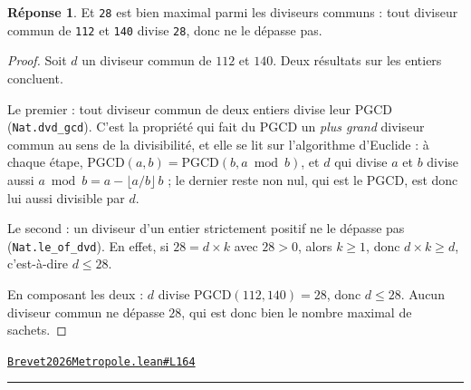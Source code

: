 \documentclass[11pt,a4paper]{article}
\theoremstyle{definition}
\theoremstyle{plain}
\theoremstyle{definition}
\newtheorem*{reponse}{Réponse}
\newcommand{\source}[2]{\par\smallskip\noindent\hfill{\footnotesize\href{#1}{\texttt{#2}}}\par\smallskip}
\begin{document}
\begin{reponse}
Et \texttt{28} est bien maximal parmi les diviseurs communs : tout diviseur commun de
\texttt{112} et \texttt{140} divise \texttt{28}, donc ne le dépasse pas.
\end{reponse}
\begin{proof}
Soit $d$ un diviseur commun de $112$ et $140$. Deux résultats sur les entiers concluent.

Le premier : tout diviseur commun de deux entiers divise leur PGCD
(\texttt{Nat.dvd\_gcd}). C'est la propriété qui fait du PGCD un \emph{plus grand} diviseur
commun au sens de la divisibilité, et elle se lit sur l'algorithme d'Euclide : à chaque
étape, $\mathrm{PGCD}(a, b) = \mathrm{PGCD}(b, a \bmod b)$, et $d$ qui divise $a$ et $b$
divise aussi $a \bmod b = a - \lfloor a/b \rfloor \, b$ ; le dernier reste non nul, qui est
le PGCD, est donc lui aussi divisible par $d$.

Le second : un diviseur d'un entier strictement positif ne le dépasse pas
(\texttt{Nat.le\_of\_dvd}). En effet, si $28 = d \times k$ avec $28 > 0$, alors $k \ge 1$,
donc $d \times k \ge d$, c'est-à-dire $d \le 28$.

En composant les deux : $d$ divise $\mathrm{PGCD}(112, 140) = 28$, donc $d \le 28$. Aucun
diviseur commun ne dépasse $28$, qui est donc bien le nombre maximal de sachets.
\end{proof}
\source{https://github.com/Commutator-IO/learn-lean/blob/main/exams/2026/Brevet2026Metropole.lean\#L164}{Brevet2026Metropole.lean\#L164}

\vfill
\noindent\rule{0.35\linewidth}{0.4pt}\par
{}
\end{document}
